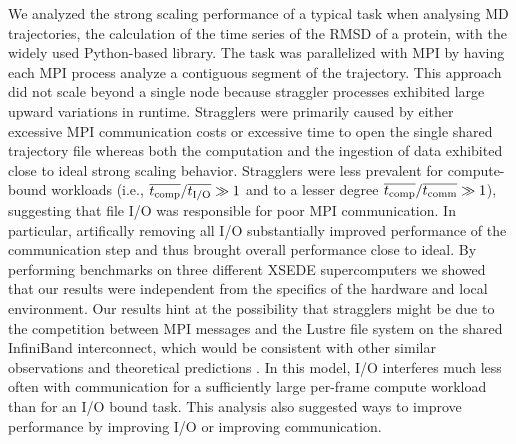 \label{sec:conclusions}

We analyzed the strong scaling performance of a typical task when analysing MD trajectories, the calculation of the time series of the RMSD of a protein, with the widely used Python-based  library.
The task was parallelized with MPI by having each MPI process analyze a contiguous segment of the trajectory.
This approach did not scale beyond a single node because straggler processes exhibited large upward variations in runtime.
Stragglers were primarily caused by either excessive MPI communication costs or excessive time to open the single shared trajectory file whereas both the computation and the ingestion of data exhibited close to ideal strong scaling behavior.
Stragglers were less prevalent for compute-bound workloads (i.e., $\overline{{t}_{\text{comp}}}/\overline{{t}_{\text{I/O}}} \gg 1$ and to a lesser degree $\overline{{t}_{\text{comp}}}/\overline{t_{\text{comm}}} \gg 1$), suggesting that file I/O was responsible for poor MPI communication.
In particular, artifically removing all I/O substantially improved performance of the communication step and thus brought overall performance close to ideal.
By performing benchmarks on three different XSEDE supercomputers we showed that our results were independent from the specifics of the hardware and local environment.
Our results hint at the possibility that stragglers might be due to the competition between MPI messages and the Lustre file system on the shared InfiniBand interconnect, which would be consistent with other similar observations \cite{VMD2013, Kevin2018} and theoretical predictions \cite{Brown:2018ab}.
In this model, I/O interferes much less often with communication for a sufficiently large per-frame compute workload than for an I/O bound task.
This analysis also suggested ways to improve performance by improving I/O or improving communication.

